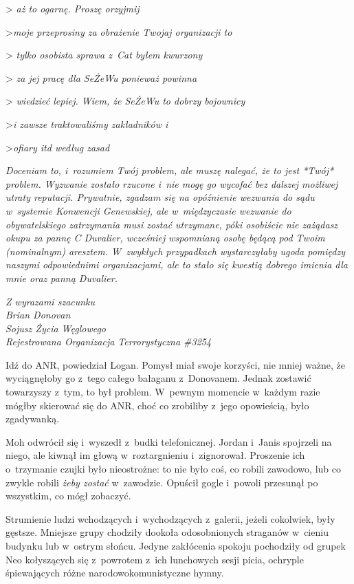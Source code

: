 \documentclass[oneside,polish,11pt,sfheadings]{mwbk}
\begin{document}
>
\emph{aż to ogarnę. Proszę orzyjmij}

>\emph{moje przeprosiny za obrażenie Twojaj organizacji to}

>
\emph{tylko osobista sprawa z~Cat byłem kwurzony}

>
\emph{za jej pracę dla SeŻeWu ponieważ powinna}

>
\emph{wiedzieć lepiej. Wiem, że SeŻeWu to dobrzy bojownicy}

>\emph{i zawsze traktowaliśmy zakładników i~}

>\emph{ofiary itd według zasad}

\emph{Doceniam to, i~rozumiem Twój problem, ale muszę nalegać, że to
jest *Twój* problem. Wyzwanie zostało rzucone i~nie mogę go wycofać bez
dalszej możliwej utraty reputacji. Prywatnie, zgadzam się na opóźnienie
wezwania do sądu w~systemie Konwencji Genewskiej, ale w~międzyczasie
wezwanie do obywatelskiego zatrzymania musi zostać utrzymane, póki
osobiście nie zażądasz okupu za pannę C Duvalier, wcześniej wspomnianą
osobę będącą pod Twoim (nominalnym) aresztem. W~zwykłych przypadkach
wystarczyłaby ugoda pomiędzy naszymi odpowiednimi organizacjami, ale to
stało się kwestią dobrego imienia dla mnie oraz panną Duvalier.}

\emph{Z wyrazami szacunku}\\
\emph{Brian Donovan}\\
\emph{ Sojusz Życia Węglowego}\\
\emph{Rejestrowana Organizacja Terrorystyczna \#3254}

Idź do ANR, powiedział Logan. Pomysł miał swoje korzyści, nie mniej
ważne, że wyciągnęłoby go z~tego całego bałaganu z~Donovanem. Jednak
zostawić towarzyszy z~tym, to był problem. W~pewnym momencie w~każdym
razie mógłby skierować się do ANR, choć co zrobiliby z~jego opowieścią,
było zgadywanką.

Moh odwrócił się i~wyszedł z~budki telefonicznej. Jordan i~Janis
spojrzeli na niego, ale kiwnął im głową w~roztargnieniu i~zignorował.
Proszenie ich o~trzymanie czujki było nieostrożne: to nie było coś, co
robili zawodowo, lub co zwykle robili \emph{żeby zostać} w~zawodzie.
Opuścił gogle i~powoli przesunął po wszystkim, co mógł zobaczyć.

Strumienie ludzi wchodzących i~wychodzących z~galerii, jeżeli cokolwiek,
były gęstsze. Mniejsze grupy chodziły dookoła odosobnionych straganów w~cieniu budynku lub w~ostrym słońcu. Jedyne zakłócenia spokoju pochodziły
od grupek Neo kołyszących się z~powrotem z~ich lunchowych sesji picia,
ochryple śpiewających różne narodowokomunistyczne hymny.
\end{document}
